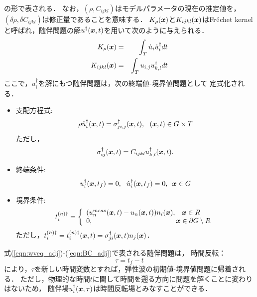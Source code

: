 の形で表される．
%
なお，$(\rho,C_{ijkl})$はモデルパラメータの現在の推定値を，
$(\delta \rho, \delta C_{ijkl})$は修正量であることを意味する．
%
$K_\rho(\boldsymbol{x})$と$K_{ijkl}(\boldsymbol{x})$はFr$\acute{\rm e}$chet 
kernelと呼ばれ，随伴問題の解$u^{\dagger}(\boldsymbol{x},t)$を用いて次のように与えられる\cite{Fichtner}．
\begin{eqnarray}
	K_\rho(\boldsymbol{x}) &= & \int _T \dot{u}_i \dot{u}^{\dagger}_i dt 
	\label{eqn:K_rho}
	\\
	K_{ijkl}(\boldsymbol{x}) &= & \int _T u_{i,j} u^{\dagger}_{k,l} dt 
	\label{eqn:K_ijkl}
\end{eqnarray}
ここで，$u_i^{\dagger}$を解にもつ随伴問題は，次の終端値-境界値問題として
定式化される．
\begin{itemize}
\item
支配方程式:
\begin{equation}
	\rho \ddot{u}_i^{\dagger}(\fat{x},t) =
	\sigma^{\dagger}_{ji,j}(\fat{x},t), \ \ 
	(\fat{x},t) \in G\times T
	\label{eqn:wveq_adj}
\end{equation}
ただし，
\begin{equation}
	\sigma_{ij}^{\dagger}(\boldsymbol{x},t)= C_{ijkl}u_{k,l}^{\dagger}(\boldsymbol{x},t).
	\label{eqn:sigma_dgg}
\end{equation}
\item 
終端条件:
\begin{equation}
	u_i^{\dagger}(\boldsymbol{x},t_f) =0,  \ \
	\dot{u}_i^{\dagger}(\boldsymbol{x},t_f) =0,  \ \, \boldsymbol{x}\in G
	\label{eqn:IC_adj}
\end{equation}
\item
境界条件:
\begin{equation}
	t_i^{(n)\dagger}
	=
	\left\{
		\begin{array}{ll}
			(
			u_n^{meas}(\fat{x},t)
			-
			u_n(\fat{x},t)
			)n_i(\fat{x}), & \fat{x}\in R \\
			0, & \hspace{-3mm} \fat{x} \in \partial G\setminus R
		\end{array}
	\right.
	\label{eqn:BC_adj}
\end{equation}
ただし，$t_i^{(n)\dagger}=t_i^{(n)\dagger}(\boldsymbol{x},t)=\sigma_{ji}^{\dagger}(\boldsymbol{x},t)n_j(\boldsymbol{x})$．
\end{itemize}
式(\ref{eqn:wveq_adj})-(\ref{eqn:BC_adj})で表される随伴問題は，
時間反転：
\begin{equation}
	\tau=t_f-t
	\label{eqn:tau_def}
\end{equation}
により，$\tau$を新しい時間変数とすれば，弾性波の初期値-境界値問題に帰着される．
ただし，物理的な時間$t$に関して時間を遡る方向に問題を解くことに変わりはないため，
随伴場$u_i^{\dagger}(\boldsymbol{x},\tau)$は時間反転場とみなすことができる．
